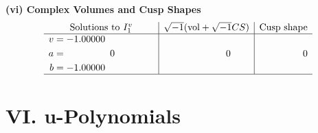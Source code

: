 \documentclass[1p]{elsarticle_modified}
\theoremstyle{definition}
\newcommand{\I}{\sqrt{-1}}
\begin{document}
\newpage\flushleft \textbf{(vi) Complex Volumes and Cusp Shapes}
$$\begin{array}{c|c|c}  
\text{Solutions to }I^v_{1}& \I (\text{vol} + \sqrt{-1}CS) & \text{Cusp shape}\\
 \hline 
\begin{aligned}
v &= -1.00000\phantom{ +0.000000I} \\
a &= \phantom{-0.000000 } 0 \\
b &= -1.00000\phantom{ +0.000000I}\end{aligned}
 & \phantom{-0.000000 } 0 & \phantom{-0.000000 } 0\\
 \hline 
 \end{array}$$\newpage
\newpage\renewcommand{\arraystretch}{1}
\centering \section*{ VI. u-Polynomials}
\end{document}
